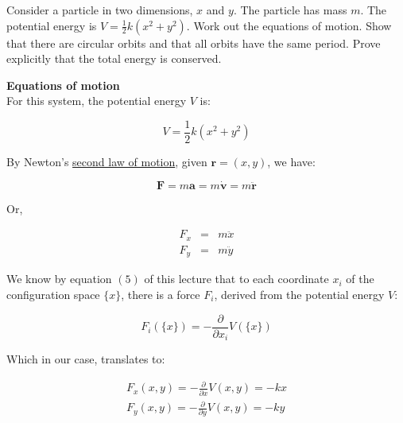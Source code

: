 \documentclass[solutions.tex]{subfiles}
\begin{document}
\maketitle
\begin{exercise}
Consider a particle in two dimensions,
$x$ and $y$. The particle has mass $m$. The potential energy
is $V=\frac{1}{2}k(x^2+y^2)$. Work out the equations of motion.
Show that there are circular orbits and that all orbits have
the same period. Prove explicitly that the total energy is
conserved.
\end{exercise}

\hr
\textbf{Equations of motion}\ \\
For this system, the potential
energy $V$ is:

\begin{equation}
\label{eqn:L05E02:epot}
V = \frac12k(x^2+y^2)
\end{equation}

By Newton's \href{https://en.wikipedia.org/wiki/Newton\%27s\_laws\_of\_motion\#Second}{
second law of motion}, given $\bm{r}=(x,y)$, we have:

\begin{equation}
	\bm{F} = m\bm{a} = m\dot{\bm{v}} = m\ddot{\bm{r}}
\end{equation}

Or,

\begin{equation}
	\label{eqn:L05E02:n2l}
	\begin{aligned}
		F_x &=& m\ddot{x} \\
		F_y &=& m\ddot{y}
	\end{aligned}
\end{equation}

We know by equation $(5)$ of this lecture that to each coordinate
$x_i$ of the configuration space $\{x\}$, there is a force $F_i$,
derived from the potential energy $V$:

\begin{equation}
	F_i(\{x\}) = -\frac{\partial}{\partial x_i}V(\{x\})
\end{equation}

Which in our case, translates to:

\begin{equation}
	\label{eqn:L05E02:fp}
	\begin{aligned}
		F_x(x, y) = -\frac{\partial}{\partial x}V(x, y) = -kx \\
		F_y(x, y) = -\frac{\partial}{\partial y}V(x, y) = -ky
	\end{aligned}
\end{equation}
\end{document}
